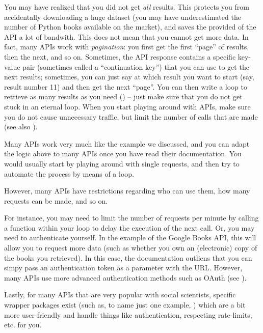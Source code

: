 
You may have realized that you did not get \emph{all} results.
This protects you from accidentally downloading a huge dataset (you
may have underestimated the number of Python books available on the
market), and saves the provided of the API a lot of bandwith.
This does not mean that you cannot get more data. In fact, many APIs work
with \emph{pagination}: you first get the first ``page'' of results,
then the next, and so on. Sometimes, the API response contains
a specific key-value pair (sometimes called a ``continuation key'')
that you can use to get the next results; sometimes, you can just
say at which result you want to start (say, result number 11) and
then get the next ``page''. You can then write a loop to retrieve
as many results as you need () -- just make sure
that you do not get stuck in an eternal loop. When you start playing
around with APIs, make sure you do not cause unnecessary traffic,
but limit the number of calls that are made (see also ).





Many APIs work very much like the example we discussed, and you
can adapt the logic above to many APIs once you have read their
documentation. You would usually start by playing around with
single requests, and then try to automate the process by means
of a loop.

However, many APIs have restrictions regarding who can use them,
how many requests can be made, and so on.

For instance, you may need to limit the number of requests per minute
by calling a  function within your loop to delay the
execution of the next call. Or, you may need to authenticate
yourself. In the example of the Google Books API, this will
allow you to request more data (such as whether you own an
(electronic) copy of the books you retrieved). In this case,
the documentation outliens that you can simpy pass an authentication
token as a parameter with the URL. However, many APIs use
more advanced authentication methods such as OAuth (see ).

Lastly, for many APIs that are very popular with social
scientists, specific wrapper packages exist (such as, to name just one example, )
which are a bit more user-friendly and handle things like authentication,
respecting rate-limits, etc. for you.
